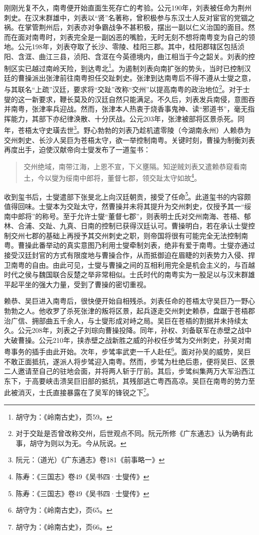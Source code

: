 刚刚光复不久，南粤便开始直面生死存亡的考验。公元190年，刘表被任命为荆州刺史。在汉末群雄中，刘表以“贤”名著称，曾积极参与东汉士人反对宦官的党锢之祸。在掌管荆州后，刘表亦对争霸战争不甚积极，摆出一副以仁义治国的面目。然而在面对南粤时，刘表完全是一副凶恶的嘴脸，无时无刻不想将南粤变为自己的领地。公元198年，刘表夺取了长沙、零陵、桂阳三郡。其中，桂阳郡辖区包括浈阳、含洭、曲江三县，浈阳、含洭在今英德境内，曲江相当于今之韶关。刘表的控制区实已越过南岭天险，到达粤北\footnote{胡守为：《岭南古史》，页59。}。为遏制刘表向南扩张的势头，当时已控制汉廷的曹操派出张津前往南粤担任交趾刺史。张津到达南粤后不得不遵从士燮之意，与其联名“上疏”汉廷，要求将“交趾”改称“交州”以提高南粤的政治地位\footnote{对于交趾是否曾改称交州，后世观点不同。阮元所修《广东通志》认为确有此事，胡守为则以为无。今从阮说。}。对于士燮的这一新要求，鞭长莫及的汉廷自然只能满足。不久后，刘表发兵南侵，意图吞并南粤，张津率兵迎战。然而，张津本人热衷于烧香事鬼神、读“邪道书”，毫无指挥能力，其部下亦纪律涣散、十分厌战。公元203年，张津被部将区景杀死。同年，苍梧太守史璜去世\footnote{阮元：（道光）《广东通志》卷181《前事略一》}。野心勃勃的刘表乃趁机遣零陵（今湖南永州）人赖恭为交州刺史、长沙人吴巨为苍梧太守，欲一举控制南粤。关键时刻，曹操为制衡刘表再度出手，迫使汉献帝向士燮发布了一道玺书：

\begin{quote}
	交州绝域，南带江海，上恩不宣，下义壅隔。知逆贼刘表又遣赖恭窥看南土，今以燮为绥南中郎将，董督七郡，领交趾太守如故\footnote{陈寿：《三国志》卷49《吴书四·士燮传》}。
\end{quote}

收到玺书后，士燮遣部下张旻北上向汉廷朝贡，接受了任命\footnote{陈寿：《三国志》卷49《吴书四·士燮传》}。此道玺书的内容颇值得回味。士燮本为交趾太守，然曹操并未将其提升为交州刺史，仅授予其一“绥南中郎将”的称号。至于允许士燮“董督七郡”，则表明士氏对交州南海、苍梧、郁林、合浦、交趾、九真、日南的控制已获得汉廷认可。曹操明白，若在承认士燮控制交州七郡的基础上再授予其交州刺史之职，则帝国将很有可能完全无法控制南粤。曹操此番举动的真实意图乃利用士燮牵制刘表，绝非有爱于南粤。士燮亦通过接受汉廷封官的方式有限度地与曹操合作，从而抵御迫在眉睫的刘表势力入侵、捍卫南粤的自由。由此可见，士燮与曹操之间的互相利用完全是机会主义的，与百越时代之侯与魏国联合反楚之举非常相似。士氏时代的南粤实为一股足以与汉末群雄平起平坐的强大力量，受到了曹操的密切重视。

赖恭、吴巨进入南粤后，很快便开始自相残杀。刘表任命的苍梧太守吴巨乃一野心勃勃之人。他收罗了杀死张津的叛将区景，起兵逐走交州刺史赖恭，盘踞于苍梧郡治广信、拥部曲五千余人，与士燮形成对峙之局。吴巨在苍梧的割据并未持续太久。公元208年，刘表之子刘琮向曹操投降。同年，孙权、刘备联军在赤壁之战中大破曹操。公元210年，挟赤壁之战新胜之威的孙权任步骘为交州刺史，孙吴对南粤事务的插手由此开始。次年，步骘率武吏一千人赴任\footnote{胡守为：《岭南古史》，页65。}。面对孙吴的威势，吴巨不敢正面抵抗，遂派人将步骘迎入南粤。然而，步骘为杜绝后患，便将吴巨、区景二人邀请至自己的驻地会面，并将两人斩于厅前。其后，步骘纠集两万大军沿西江东下，于高要峡击溃吴巨旧部的抵抗，其残部逃亡粤西高凉。吴巨在南粤的势力至此被消灭，士氏直接暴露在了吴军的锋锐之下\footnote{胡守为：《岭南古史》，页66。}。

